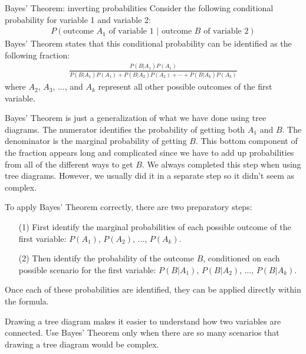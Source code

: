 \begin{onebox}{Bayes' Theorem: inverting probabilities}
Consider the following conditional probability for variable 1 and variable 2:\vspace{-1.5mm}
\begin{align*}
P(\text{outcome $A_1$ of variable 1 } | \text{ outcome $B$ of variable 2})
\end{align*}
Bayes' Theorem states that this conditional probability can be identified as the following fraction:\vspace{-1.5mm}
\begin{align}
\frac{P(B | A_1) P(A_1)}
	{P(B | A_1) P(A_1) + P(B | A_2) P(A_2) + \cdots + P(B | A_k) P(A_k)}
	\label{equationOfBayesTheorem}
\end{align}
where $A_2$, $A_3$, ..., and $A_k$ represent all other possible outcomes of the first variable.
\end{onebox}

Bayes' Theorem is just a generalization of what we have done using tree diagrams. The numerator identifies the probability of getting both $A_1$ and $B$. The denominator is the marginal probability of getting $B$. This bottom component of the fraction appears long and complicated since we have to add up probabilities from all of the different ways to get $B$. We always completed this step when using tree diagrams. However, we usually did it in a separate step so it didn't seem as complex.

To apply Bayes' Theorem correctly, there are two preparatory steps:
\begin{enumerate}
\setlength{\itemsep}{0mm}
\item[(1)] First identify the marginal probabilities of each possible outcome of the first variable: $P(A_1)$, $P(A_2)$, ..., $P(A_k)$.
\item[(2)] Then identify the probability of the outcome $B$, conditioned on each possible scenario for the first variable: $P(B | A_1)$, $P(B | A_2)$, ..., $P(B | A_k)$.
\end{enumerate}
Once each of these probabilities are identified, they can be applied directly within the formula.

\begin{tipBox}{
Drawing a tree diagram makes it easier to understand how two variables are connected. Use Bayes' Theorem only when there are so many scenarios that drawing a tree diagram would be complex.}
\end{tipBox}

